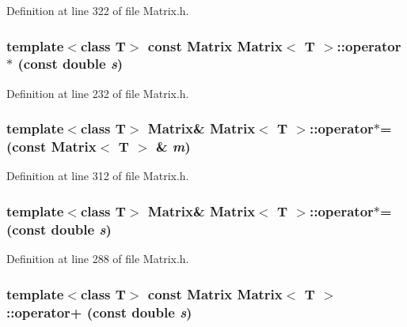 Definition at line 322 of file Matrix.h.

\hypertarget{classMatrix_ac4e94b307c56a15fb47a9255855f94a9}{
\subsubsection[{operator$\ast$}]{\setlength{\rightskip}{0pt plus 5cm}template$<$class T$>$ const {\bf Matrix} {\bf Matrix}$<$ T $>$::operator$\ast$ (const double {\em s})}}
\label{classMatrix_ac4e94b307c56a15fb47a9255855f94a9}


Definition at line 232 of file Matrix.h.

\hypertarget{classMatrix_a3226c4b1a3ffb1090a7434806ad2ef03}{
\subsubsection[{operator$\ast$=}]{\setlength{\rightskip}{0pt plus 5cm}template$<$class T$>$ {\bf Matrix}\& {\bf Matrix}$<$ T $>$::operator$\ast$= (const {\bf Matrix}$<$ T $>$ \& {\em m})}}
\label{classMatrix_a3226c4b1a3ffb1090a7434806ad2ef03}


Definition at line 312 of file Matrix.h.

\hypertarget{classMatrix_a8079792abad8b038cd795a339ce9747b}{
\subsubsection[{operator$\ast$=}]{\setlength{\rightskip}{0pt plus 5cm}template$<$class T$>$ {\bf Matrix}\& {\bf Matrix}$<$ T $>$::operator$\ast$= (const double {\em s})}}
\label{classMatrix_a8079792abad8b038cd795a339ce9747b}


Definition at line 288 of file Matrix.h.

\hypertarget{classMatrix_a3c70791a9bb45afff8d0ea23601e3203}{
\subsubsection[{operator+}]{\setlength{\rightskip}{0pt plus 5cm}template$<$class T$>$ const {\bf Matrix} {\bf Matrix}$<$ T $>$::operator+ (const double {\em s})}}
\label{classMatrix_a3c70791a9bb45afff8d0ea23601e3203}


